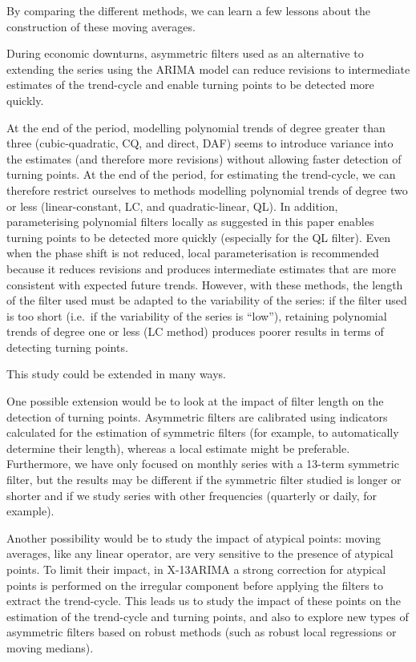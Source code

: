 \documentclass[
]{article}
\newcommand\1{\mathds{1}}
\begin{document}
By comparing the different methods, we can learn a few lessons about the
construction of these moving averages.

During economic downturns, asymmetric filters used as an alternative to
extending the series using the ARIMA model can reduce revisions to
intermediate estimates of the trend-cycle and enable turning points to
be detected more quickly.

At the end of the period, modelling polynomial trends of degree greater
than three (cubic-quadratic, CQ, and direct, DAF) seems to introduce
variance into the estimates (and therefore more revisions) without
allowing faster detection of turning points. At the end of the period,
for estimating the trend-cycle, we can therefore restrict ourselves to
methods modelling polynomial trends of degree two or less
(linear-constant, LC, and quadratic-linear, QL). In addition,
parameterising polynomial filters locally as suggested in this paper
enables turning points to be detected more quickly (especially for the
QL filter). Even when the phase shift is not reduced, local
parameterisation is recommended because it reduces revisions and
produces intermediate estimates that are more consistent with expected
future trends. However, with these methods, the length of the filter
used must be adapted to the variability of the series: if the filter
used is too short (i.e.~if the variability of the series is ``low''),
retaining polynomial trends of degree one or less (LC method) produces
poorer results in terms of detecting turning points.

This study could be extended in many ways.

One possible extension would be to look at the impact of filter length
on the detection of turning points. Asymmetric filters are calibrated
using indicators calculated for the estimation of symmetric filters (for
example, to automatically determine their length), whereas a local
estimate might be preferable. Furthermore, we have only focused on
monthly series with a 13-term symmetric filter, but the results may be
different if the symmetric filter studied is longer or shorter and if we
study series with other frequencies (quarterly or daily, for example).

Another possibility would be to study the impact of atypical points:
moving averages, like any linear operator, are very sensitive to the
presence of atypical points. To limit their impact, in X-13ARIMA a
strong correction for atypical points is performed on the irregular
component before applying the filters to extract the trend-cycle. This
leads us to study the impact of these points on the estimation of the
trend-cycle and turning points, and also to explore new types of
asymmetric filters based on robust methods (such as robust local
regressions or moving medians).
\end{document}
